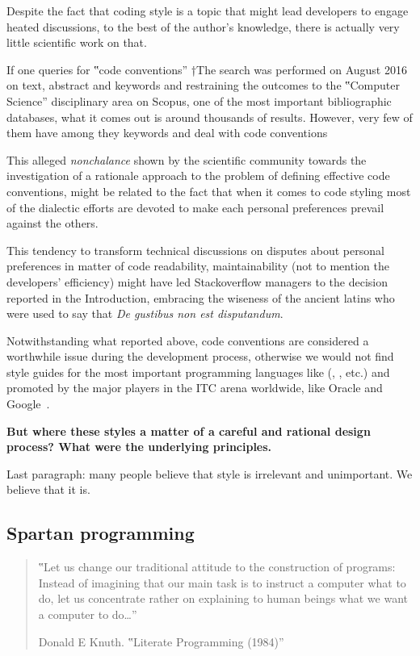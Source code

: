 Despite the fact that coding style is a topic that might lead developers to
engage heated discussions, to the best of the author's knowledge, there is
actually very little scientific work on that.

If one queries for ‟code conventions” †{The search was
performed on August 2016 on text, abstract and keywords and
restraining the outcomes to the ‟Computer Science” disciplinary area} on
Scopus, one of the most important bibliographic
databases, what it comes out is around thousands of results. However, very few of them have  among they keywords and deal with code conventions

This alleged \emph{nonchalance} shown by the scientific community towards the
investigation of a rationale approach to the problem of defining effective code
conventions, might be related to the fact that when it comes to code styling
most of the dialectic efforts are devoted
to make each personal preferences prevail against the others.

This tendency to transform technical discussions on disputes about personal preferences
in matter of code readability, maintainability (not to mention the developers' efficiency) might
have led Stackoverflow managers to the decision reported in the Introduction, embracing the
wiseness of the ancient latins who were used to say that \emph{De gustibus non est disputandum}.

Notwithstanding what reported above, code conventions are considered a worthwhile issue during
the development process, otherwise we would not find style guides for the most important
programming languages like (\Java, \CC, etc.) and promoted by the major players in
the ITC arena worldwide, like Oracle and Google~\cite{mising:quaote}.

\textbf{But where these styles a matter of a careful and rational design process?
What were the underlying principles.}

Last paragraph: many people believe that style is irrelevant and unimportant.
We believe that it is.

\subsection{Spartan programming}

\begin{quote}
  ‟Let us change our traditional attitude to the construction of programs:
  Instead of imagining that our main task is to instruct a computer what to do,
  let us concentrate rather on explaining to human beings what we want a computer
  to do…”
  \begin{flushright}
   \upshape Donald E Knuth. ‟Literate Programming (1984)”
  \end{flushright}
\end{quote}

